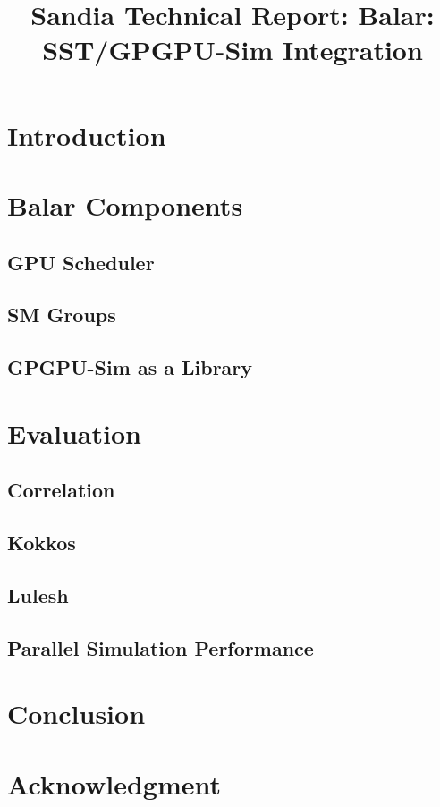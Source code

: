 \documentclass[12pt]{article}
\newcommand{\proptitle}{Sandia Technical Report: Balar: SST/GPGPU-Sim Integration}
\begin{document}

\title{\proptitle}


\newpage


    
\section{Introduction}
    
\section{Balar Components}
    \subsection{GPU Scheduler}
        
    \subsection{SM Groups}
        
    \subsection{GPGPU-Sim as a Library}
        
\section{Evaluation}
    \subsection{Correlation}
        
    \subsection{Kokkos}
        
    \subsection{Lulesh}
        
    \subsection{Parallel Simulation Performance}
        
%
\section{Conclusion}
    

\clearpage
\section*{Acknowledgment}


\clearpage



\end{document}
